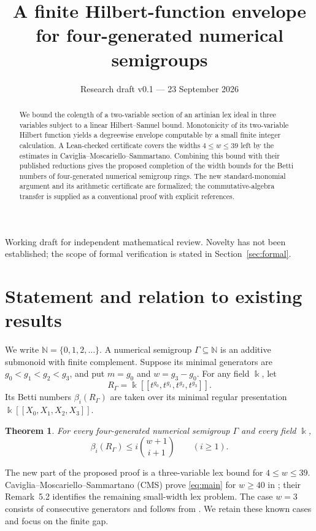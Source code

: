 \documentclass[11pt,a4paper]{article}
\title{A finite Hilbert-function envelope for four-generated numerical semigroups}
\author{}
\date{Research draft v0.1 --- 23 September 2026}
\newtheorem{theorem}{Theorem}[section]
\newcommand{\NN}{\mathbb N}
\newcommand{\kk}{\Bbbk}
\newcommand{\llbracket}{[\![}
\newcommand{\rrbracket}{]\!]}
\begin{document}
\maketitle
\vspace{-1.4em}
\begin{center}\small
Working draft for independent mathematical review.
Novelty has not been established; the scope of formal verification is stated in Section~\ref{sec:formal}.
\end{center}
\begin{abstract}
We bound the colength of a two-variable section of an artinian lex ideal in three variables subject to a linear Hilbert--Samuel bound. Monotonicity of its two-variable Hilbert function yields a degreewise envelope computable by a small finite integer calculation. A Lean-checked certificate covers the widths $4\le w\le39$ left by the estimates in Caviglia--Moscariello--Sammartano. Combining this bound with their published reductions gives the proposed completion of the width bounds for the Betti numbers of four-generated numerical semigroup rings. The new standard-monomial argument and its arithmetic certificate are formalized; the commutative-algebra transfer is supplied as a conventional proof with explicit references.
\end{abstract}

\section{Statement and relation to existing results}
We write $\NN=\{0,1,2,\ldots\}$. A numerical semigroup $\Gamma\subseteq\NN$ is an additive submonoid with finite complement. Suppose its minimal generators are $g_0<g_1<g_2<g_3$, and put $m=g_0$ and $w=g_3-g_0$. For any field $\kk$, let
\[
 R_\Gamma=\kk\llbracket t^{g_0},t^{g_1},t^{g_2},t^{g_3}\rrbracket.
\]
Its Betti numbers $\beta_i(R_\Gamma)$ are taken over its minimal regular presentation $\kk\llbracket X_0,X_1,X_2,X_3\rrbracket$.

\begin{theorem}\label{thm:main}
For every four-generated numerical semigroup $\Gamma$ and every field $\kk$,
\begin{equation}\label{eq:main}
 \beta_i(R_\Gamma)\le i\binom{w+1}{i+1}\qquad(i\ge1).
\end{equation}
\end{theorem}

The new part of the proposed proof is a three-variable lex bound for $4\le w\le39$. Caviglia--Moscariello--Sammartano (CMS) prove \eqref{eq:main} for $w\ge40$ in \cite[Theorem~1.5]{CMS}; their Remark~5.2 identifies the remaining small-width lex problem. The case $w=3$ consists of consecutive generators and follows from \cite[Proposition~2.7]{HS}. We retain these known cases and focus on the finite gap.
\end{document}
